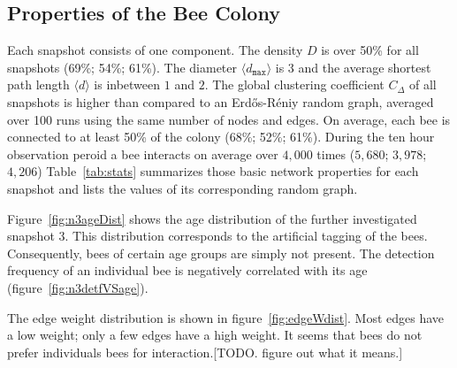 \subsection{Properties of the Bee Colony}
\label{subsec:colony}
Each snapshot consists of one component.
The density $D$ is over 50\% for all snapshots (69\%; 54\%; 61\%).
The diameter $\langle d_{\texttt{max}} \rangle$ is $3$ and the average shortest path length $\langle d \rangle$ is inbetween $1$ and $2$.
The global clustering coefficient $C_\Delta$ of all snapshots is higher than compared to an Erd\H{o}s-R\'{e}niy random graph, averaged over 100 runs using the same number of nodes and edges.
On average, each bee is connected to at least 50\% of the colony (68\%; 52\%; 61\%). During the ten hour observation peroid a bee interacts on average over $4,000$ times ($5,680$; $3,978$; $4,206$)
Table~\ref{tab:stats} summarizes those basic network properties for each snapshot and lists the values of its corresponding random graph.


Figure~\ref{fig:n3ageDist} shows the age distribution of the further investigated snapshot 3. This distribution corresponds to the artificial tagging of the bees. Consequently, bees of certain age groups are simply not present. The detection frequency of an individual bee is negatively correlated with its age (figure~\ref{fig:n3detfVSage}).



The edge weight distribution is shown in figure~\ref{fig:edgeWdist}.
Most edges have a low weight; only a few edges have a high weight.
It seems that bees do not prefer individuals bees for interaction.[TODO. figure out what it means.]

